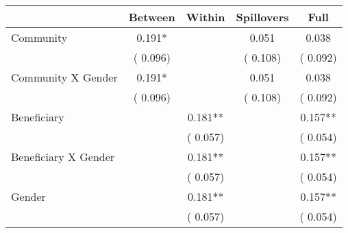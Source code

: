 
\begin{tabular}{l*{4}{c}}\hline&\multicolumn{1}{c}{Between}&\multicolumn{1}{c}{Within}&\multicolumn{1}{c}{Spillovers}&\multicolumn{1}{c}{Full}\\ \hline
 Community                                     &              0.191*      &                                               &        0.051 &         0.038                            \\ 
                                                       &        (       0.096)           &                                       &       (       0.108)     &      (       0.092)                                           \\ 
 Community X Gender            &              0.191*      &                                               &        0.051 &         0.038                            \\ 
                                                       &        (       0.096)           &                                       &       (       0.108)     &      (       0.092)                                           \\ 
 Beneficiary                           &                                               &        0.181**    &                                &             0.157**                            \\ 
                                                       &                                               & (       0.057)                  &                                        &      (       0.054)                                           \\ 
 Beneficiary X Gender          &                                               &        0.181**    &                                &             0.157**                            \\ 
                                                       &                                               & (       0.057)                  &                                        &      (       0.054)                                           \\ 
 Gender                                        &                              &        0.181**    &                                &             0.157**                            \\ 
                                                       &                                               & (       0.057)                  &                                        &      (       0.054)                                           \\ 

\end{tabular}
